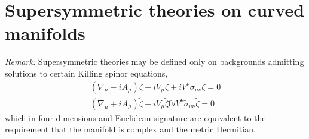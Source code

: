 \section{Supersymmetric theories on curved manifolds}
\textit{Remark:} Supersymmetric theories may be defined only on backgrounds admitting solutions to certain Killing spinor equations,
\begin{align}
\left(\nabla_\mu-iA_\mu\right)\zeta + iV_\mu\zeta + iV^\nu\sigma_{\mu\nu}\zeta = 0\\
\left(\nabla_\mu+iA_\mu\right)\tilde{\zeta} - iV_\mu\tilde{\zeta} 0 iV^\nu\tilde{\sigma}_{\mu\nu}\tilde{\zeta} = 0
\end{align}
which in four dimensions and Euclidean signature are
equivalent to the requirement that the manifold is complex and the metric Hermitian.


